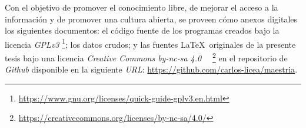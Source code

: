 Con el objetivo de promover el conocimiento libre, de mejorar el acceso a la información y de promover una cultura abierta, se proveen cómo anexos digitales los siguientes documentos: el código fuente de los programas creados bajo la licencia \emph{GPLv3} \footnote{\url{https://www.gnu.org/licenses/quick-guide-gplv3.en.html}}; los datos crudos; y las fuentes \LaTeX\ originales de la presente tesis bajo una licencia \emph{Creative Commons by-nc-sa 4.0$\quad$}  \footnote{\url{https://creativecommons.org/licenses/by-nc-sa/4.0/}} en el repositorio de \emph{Github} disponible en la siguiente \emph{URL}: \url{https://github.com/carlos-licea/maestria}.